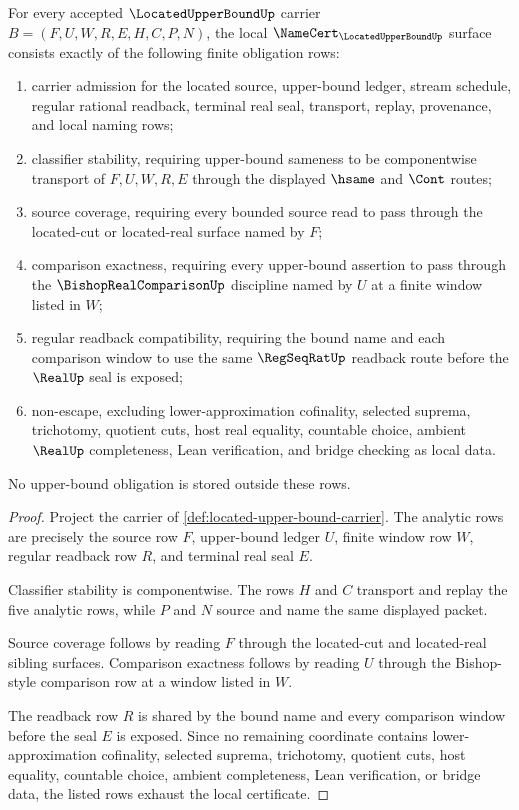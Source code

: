 \begin{theorem}
\label{thm:located-upper-bound-namecert-obligations}
For every accepted $\LocatedUpperBoundUp$ carrier $B=(F,U,W,R,E,H,C,P,N)$, the local $\NameCert_{\LocatedUpperBoundUp}$ surface consists exactly of the following finite obligation rows:
\begin{enumerate}
\item carrier admission for the located source, upper-bound ledger, stream schedule, regular rational readback, terminal real seal, transport, replay, provenance, and local naming rows;
\item classifier stability, requiring upper-bound sameness to be componentwise transport of $F,U,W,R,E$ through the displayed $\hsame$ and $\Cont$ routes;
\item source coverage, requiring every bounded source read to pass through the located-cut or located-real surface named by $F$;
\item comparison exactness, requiring every upper-bound assertion to pass through the $\BishopRealComparisonUp$ discipline named by $U$ at a finite window listed in $W$;
\item regular readback compatibility, requiring the bound name and each comparison window to use the same $\RegSeqRatUp$ readback route before the $\RealUp$ seal is exposed;
\item non-escape, excluding lower-approximation cofinality, selected suprema, trichotomy, quotient cuts, host real equality, countable choice, ambient $\RealUp$ completeness, Lean verification, and bridge checking as local data.
\end{enumerate}
No upper-bound obligation is stored outside these rows.
\end{theorem}
\begin{proof}
Project the carrier of \autoref{def:located-upper-bound-carrier}. The analytic rows are precisely the source row $F$, upper-bound ledger $U$, finite window row $W$, regular readback row $R$, and terminal real seal $E$.

Classifier stability is componentwise. The rows $H$ and $C$ transport and replay the five analytic rows, while $P$ and $N$ source and name the same displayed packet.

Source coverage follows by reading $F$ through the located-cut and located-real sibling surfaces. Comparison exactness follows by reading $U$ through the Bishop-style comparison row at a window listed in $W$.

The readback row $R$ is shared by the bound name and every comparison window before the seal $E$ is exposed. Since no remaining coordinate contains lower-approximation cofinality, selected suprema, trichotomy, quotient cuts, host equality, countable choice, ambient completeness, Lean verification, or bridge data, the listed rows exhaust the local certificate.
\end{proof}

